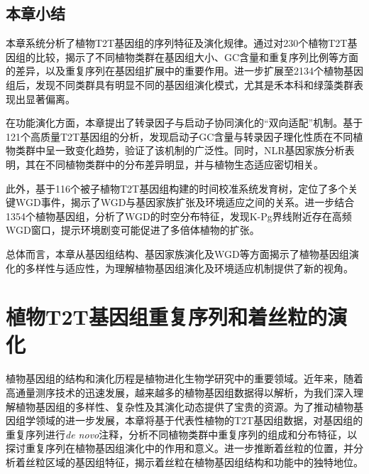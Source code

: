\section{本章小结}

本章系统分析了植物T2T基因组的序列特征及演化规律。通过对230个植物T2T基因组的比较，揭示了不同植物类群在基因组大小、GC含量和重复序列比例等方面的差异，以及重复序列在基因组扩展中的重要作用。进一步扩展至2134个植物基因组后，发现不同类群具有明显不同的基因组演化模式，尤其是禾本科和绿藻类群表现出显著偏离。

在功能演化方面，本章提出了转录因子与启动子协同演化的“双向适配”机制。基于121个高质量T2T基因组的分析，发现启动子GC含量与转录因子理化性质在不同植物类群中呈一致变化趋势，验证了该机制的广泛性。同时，NLR基因家族分析表明，其在不同植物类群中的分布差异明显，并与植物生态适应密切相关。

此外，基于116个被子植物T2T基因组构建的时间校准系统发育树，定位了多个关键WGD事件，揭示了WGD与基因家族扩张及环境适应之间的关系。进一步结合1354个植物基因组，分析了WGD的时空分布特征，发现K-Pg界线附近存在高频WGD窗口，提示环境剧变可能促进了多倍体植物的扩张。

总体而言，本章从基因组结构、基因家族演化及WGD等方面揭示了植物基因组演化的多样性与适应性，为理解植物基因组演化及环境适应机制提供了新的视角。

\chapter{植物T2T基因组重复序列和着丝粒的演化}

植物基因组的结构和演化历程是植物进化生物学研究中的重要领域。近年来，随着高通量测序技术的迅速发展，越来越多的植物基因组数据得以解析，为我们深入理解植物基因组的多样性、复杂性及其演化动态提供了宝贵的资源。为了推动植物基因组学领域的进一步发展，本章将基于代表性植物的T2T基因组数据，对基因组的重复序列进行\textit{de novo}注释，分析不同植物类群中重复序列的组成和分布特征，以探讨重复序列在植物基因组演化中的作用和意义。进一步推断着丝粒的位置，并分析着丝粒区域的基因组特征，揭示着丝粒在植物基因组结构和功能中的独特地位。


